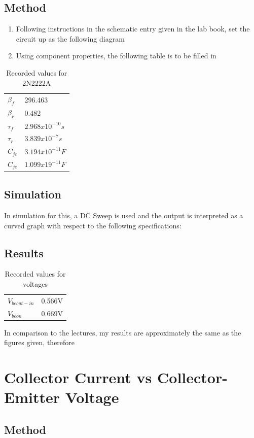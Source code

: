 \documentclass[12pt]{article}
\begin{document}
\subsection{Method}
\begin{enumerate}
\item Following instructions in the schematic entry given in the lab book, set the circuit up as the following diagram
\item Using component properties, the following table is to be filled in
\end{enumerate}
\begin{table}[h]
\centering
\begin{tabular}{ll}
$\beta_f$  & 296.463  \\
$\beta_r$  & 0.482 \\
$\tau_f$  & $2.968x10^{-10}s$      \\
$\tau_r$  & $3.839x10^{-7}s$        \\
$C_{jc}$ & $3.194x10^{-11}F$        \\
$C_{je}$ & $1.099x19^{-11}F$        
\end{tabular}
\caption{Recorded values for 2N2222A}
\end{table}
\subsection{Simulation}
In  simulation for this, a DC Sweep is used and the output is interpreted as a curved graph with respect to the following specifications:
\subsection{Results}
\begin{table}[h]
\centering
\begin{tabular}{ll}
$V_{be cut-in}$  & 0.566V  \\
$V_{be on}$  & 0.669V      
\end{tabular}
\caption{Recorded values for voltages}
\end{table}
In comparison to the lectures, my results are approximately the same as the figures given, therefore 

\section{Collector Current vs Collector-Emitter Voltage}
\subsection{Method}
\end{document}
